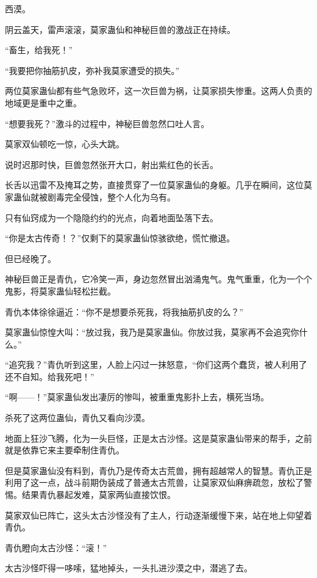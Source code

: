 
\begin{this_body}

西漠。

阴云盖天，雷声滚滚，莫家蛊仙和神秘巨兽的激战正在持续。

“畜生，给我死！”

“我要把你抽筋扒皮，弥补我莫家遭受的损失。”

两位莫家蛊仙都有些气急败坏，这一次巨兽为祸，让莫家损失惨重。这两人负责的地域更是重中之重。

“想要我死？”激斗的过程中，神秘巨兽忽然口吐人言。

莫家双仙顿吃一惊，心头大跳。

说时迟那时快，巨兽忽然张开大口，射出紫红色的长舌。

长舌以迅雷不及掩耳之势，直接贯穿了一位莫家蛊仙的身躯。几乎在瞬间，这位莫家蛊仙就被剧毒完全侵蚀，整个人化为乌有。

只有仙窍成为一个隐隐约约的光点，向着地面坠落下去。

“你是太古传奇！？”仅剩下的莫家蛊仙惊骇欲绝，慌忙撤退。

但已经晚了。

神秘巨兽正是青仇，它冷笑一声，身边忽然冒出汹涌鬼气。鬼气重重，化为一个个鬼影，将莫家蛊仙轻松拦截。

青仇本体徐徐逼近：“你不是想要杀死我，将我抽筋扒皮的么？”

莫家蛊仙惊惶大叫：“放过我，我乃是莫家蛊仙。你放过我，莫家再不会追究你什么。”

“追究我？”青仇听到这里，人脸上闪过一抹怒意，“你们这两个蠢货，被人利用了还不自知。给我死吧！”

“啊——！”莫家蛊仙发出凄厉的惨叫，被重重鬼影扑上去，横死当场。

杀死了这两位蛊仙，青仇又看向沙漠。

地面上狂沙飞腾，化为一头巨怪，正是太古沙怪。这是莫家蛊仙带来的帮手，之前就是依靠它来主要牵制住青仇。

但是莫家蛊仙没有料到，青仇乃是传奇太古荒兽，拥有超越常人的智慧。青仇正是利用了这一点，战斗前期伪装成了普通太古荒兽，让莫家双仙麻痹疏忽，放松了警惕。结果青仇暴起发难，莫家两仙直接饮恨。

莫家双仙已阵亡，这头太古沙怪没有了主人，行动逐渐缓慢下来，站在地上仰望着青仇。

青仇瞪向太古沙怪：“滚！”

太古沙怪吓得一哆嗦，猛地掉头，一头扎进沙漠之中，潜逃了去。


\end{this_body}
